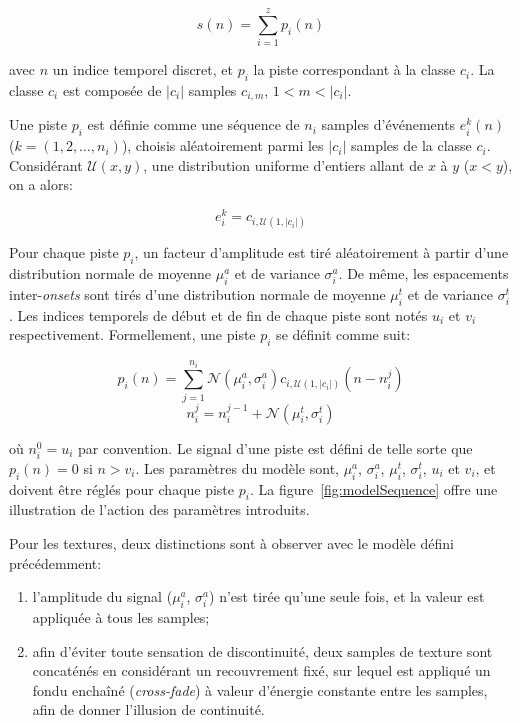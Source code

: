 \begin{equation}
 s(n)=\sum_{i=1}^{z}p_i(n)
 \end{equation}

avec $n$ un indice temporel discret, et $p_i$ la piste correspondant à la classe $c_i$. La classe $c_i$ est composée de $\vert c_i\vert$ samples $c_{i,m}$, $1<m<\vert c_i\vert$. 

Une piste $p_i$ est définie comme une séquence de $n_i$ samples d'événements $e^k_i(n)$ ($k=(1,2,\ldots,n_i)$), choisis aléatoirement parmi les $\vert c_i\vert$ samples de la classe $c_i$. Considérant $\mathcal{U}(x,y)$, une distribution uniforme d'entiers allant de $x$ à $y$ ($x<y$), on a alors:

 \begin{equation}
 e^k_i=c_{i,\mathcal{U}(1,\vert c_i \vert)}
 \end{equation}

 Pour chaque piste $p_i$, un facteur d'amplitude est tiré aléatoirement à partir d'une distribution normale de moyenne $\mu^a_i$ et de variance $\sigma^a_i$. De même, les espacements inter-\emph{onsets} sont tirés d'une distribution normale de moyenne $\mu^t_i$ et de variance $\sigma^t_i$. Les indices temporels de début et de fin de chaque piste sont notés $u_i$ et $v_i$ respectivement. Formellement, une piste $p_i$ se définit comme suit:
 
\begin{equation}
\label{eq1}
p_{i}(n)= \sum_{j=1}^{n_i} \mathcal{N}(\mu^a_{i},\sigma^a_{i})c_{i, \mathcal{U} (1, |c_i|)}(n-n^j_i)
\end{equation}
\begin{equation}
\label{eq2}
n_i^j=n_i^{j-1} + \mathcal{N}({\mu^t_{i},\sigma^t_{i}})
\end{equation}

où $n_i^0=u_i$ par convention. Le signal d'une piste est défini de telle sorte que $p_i(n)=0$ si $n>v_i$. Les paramètres du modèle sont, $\mu^a_i$,  $\sigma^a_i$,   $\mu^t_i$,  $\sigma^t_i$, $u_i$ et $v_i$, et doivent être réglés pour chaque piste $p_i$. La figure~\ref{fig:modelSequence} offre une illustration de l'action des paramètres introduits.


Pour les textures, deux distinctions sont à observer avec le modèle défini précédemment: 

\begin{enumerate}
\item l'amplitude du signal ($\mu^a_i$,  $\sigma^a_i$) n'est tirée qu'une seule fois, et la valeur est appliquée à tous les samples;
\item afin d'éviter toute sensation de discontinuité, deux samples de texture sont concaténés en considérant un recouvrement fixé, sur lequel est appliqué un fondu enchaîné (\emph{cross-fade}) à valeur d'énergie constante entre les samples,  afin de donner l'illusion de continuité.
\end{enumerate}


